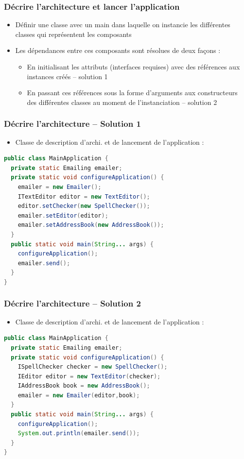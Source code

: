 \documentclass{beamer}
\begin{document}
\begin{frame}
  \frametitle{Décrire l'architecture et lancer l'application}  
  \begin{itemize}
  \item Définir une classe avec un main dans laquelle on instancie les
    différentes classes qui représentent les composants

  \item Les dépendances entre ces composants sont résolues de deux
    façons :
  \begin{itemize}
  \item En initialisant les attributs (interfaces requises) avec des
    références aux instances créés -- solution 1
  \item En passant ces références sous la forme d'arguments aux
    constructeurs des différentes classes au moment de l'instanciation
    -- solution 2
  \end{itemize}
\end{itemize}
\end{frame}

\begin{frame}[fragile]
  \frametitle{Décrire l'architecture -- Solution 1} 
  \begin{itemize}
  \item Classe de description d'archi. et de lancement de
    l'application :
  \end{itemize}
  \begin{lstlisting}[language=Java]    
public class MainApplication {
  private static Emailing emailer;
  private static void configureApplication() {
    emailer = new Emailer();
    ITextEditor editor = new TextEditor();
    editor.setChecker(new SpellChecker());
    emailer.setEditor(editor);
    emailer.setAddressBook(new AddressBook());
  }
  public static void main(String... args) {
    configureApplication();
    emailer.send();
  }
}
  \end{lstlisting}  
\end{frame}

\begin{frame}[fragile]
  \frametitle{Décrire l'architecture -- Solution 2} 
  \begin{itemize}
  \item Classe de description d'archi. et de lancement de
    l'application :
  \end{itemize}
  \begin{lstlisting}[language=Java]
public class MainApplication {
  private static Emailing emailer;
  private static void configureApplication() {
    ISpellChecker checker = new SpellChecker();
    IEditor editor = new TextEditor(checker);
    IAddressBook book = new AddressBook();
    emailer = new Emailer(editor,book);
  }
  public static void main(String... args) {
    configureApplication();
    System.out.println(emailer.send());
  }
}
  \end{lstlisting}  
\end{frame}
\end{document}
